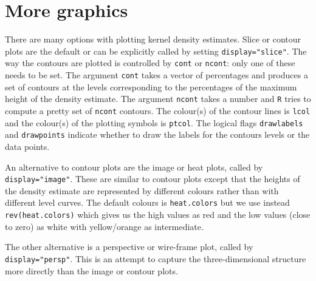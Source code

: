 \documentclass[a4paper,11pt]{article}
\begin{document}


\section{More graphics}
There are many options with plotting kernel density estimates. 
Slice or contour plots are the default or can be explicitly called by setting
\texttt{display="slice"}. The way the contours are plotted is controlled by
\texttt{cont} or \texttt{ncont}: only one of these needs to be set. 
The argument 
\texttt{cont} takes a vector of percentages and produces a set of contours
at the levels corresponding to the percentages of the maximum height of the 
density estimate. The argument 
\texttt{ncont} takes a number and \texttt{R} tries to 
compute a pretty set of \texttt{ncont} contours.  
The colour(s) of the contour lines is \texttt{lcol} and
the colour(s) of the plotting symbols is \texttt{ptcol}.
The logical flags \texttt{drawlabels} and \texttt{drawpoints} indicate
whether to draw the labels for the contours levels or the data points.

An alternative to contour plots are the image or heat plots,
called by \texttt{display="image"}.  These 
are similar to contour plots except that the heights of the density 
estimate are represented by different colours rather than with
different level curves. The default colours is \texttt{heat.colors}
but we use instead \texttt{rev(heat.colors)} which gives us the high 
values as red and the low values (close to zero) as white with
yellow/orange as intermediate. 

The other alternative is a perspective or wire-frame plot, 
called by \texttt{display="persp"}. This is an attempt
to capture the three-dimensional structure more directly than the 
image or contour plots.

\end{document}

